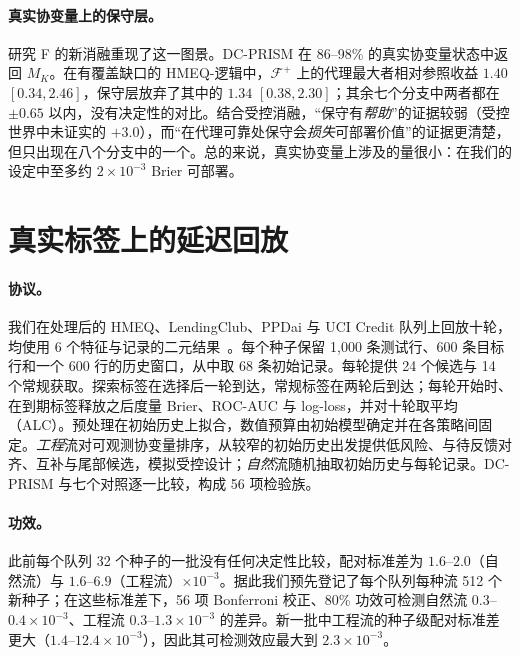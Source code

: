 \documentclass[runningheads]{llncs}
\begin{document}
\paragraph{真实协变量上的保守层。}研究 F 的新消融重现了这一图景。DC-PRISM 在 86--98\% 的真实协变量状态中返回 $M_K$。在有覆盖缺口的 HMEQ-逻辑中，$\mathcal F^+$ 上的代理最大者相对参照收益 $1.40$ $[0.34,2.46]$，保守层放弃了其中的 $1.34$ $[0.38,2.30]$；其余七个分支中两者都在 $\pm0.65$ 以内，没有决定性的对比。结合受控消融，“保守有\emph{帮助}”的证据较弱（受控世界中未证实的 $+3.0$），而“在代理可靠处保守会\emph{损失}可部署价值”的证据更清楚，但只出现在八个分支中的一个。总的来说，真实协变量上涉及的量很小：在我们的设定中至多约 $2\times10^{-3}$ Brier 可部署。

\section{真实标签上的延迟回放}
\label{sec:replay}
\paragraph{协议。}我们在处理后的 HMEQ、LendingClub、PPDai 与 UCI Credit 队列上回放十轮，均使用 6 个特征与记录的二元结果~\cite{sasHMEQ,lendingclubSource,ppdaiSource,he2018ensemble,yeh2009comparison}。每个种子保留 1{,}000 条测试行、600 条目标行和一个 600 行的历史窗口，从中取 68 条初始记录。每轮提供 24 个候选与 14 个常规获取。探索标签在选择后一轮到达，常规标签在两轮后到达；每轮开始时、在到期标签释放之后度量 Brier、ROC-AUC 与 log-loss，并对十轮取平均（ALC）。预处理在初始历史上拟合，数值预算由初始模型确定并在各策略间固定。\emph{工程}流对可观测协变量排序，从较窄的初始历史出发提供低风险、与待反馈对齐、互补与尾部候选，模拟受控设计；\emph{自然}流随机抽取初始历史与每轮记录。DC-PRISM 与七个对照逐一比较，构成 56 项检验族。

\paragraph{功效。}此前每个队列 32 个种子的一批没有任何决定性比较，配对标准差为 $1.6$--$2.0$（自然流）与 $1.6$--$6.9$（工程流）$\times10^{-3}$。据此我们预先登记了每个队列每种流 512 个新种子；在这些标准差下，56 项 Bonferroni 校正、80\% 功效可检测自然流 $0.3$--$0.4\times10^{-3}$、工程流 $0.3$--$1.3\times10^{-3}$ 的差异。新一批中工程流的种子级配对标准差更大（$1.4$--$12.4\times10^{-3}$），因此其可检测效应最大到 $2.3\times10^{-3}$。
\end{document}
